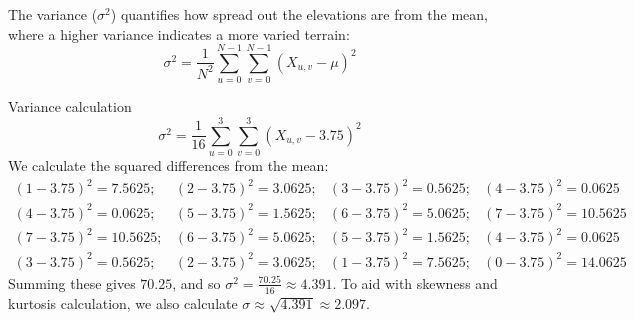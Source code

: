 The variance ($\sigma^2$) quantifies how spread out the elevations are from the mean, where a higher variance indicates a more varied terrain:
\[\sigma^2=\frac{1}{N^2}\sum_{u=0}^{N-1}\sum_{v=0}^{N-1}{(X_{u,v}-\mu)}^2\]
\begin{example}{Variance calculation}
    \[\sigma^2=\frac{1}{16}\sum_{u=0}^{3}\sum_{v=0}^{3}{(X_{u,v}-3.75)}^2\]
    We calculate the squared differences from the mean:
    \begin{equation*}
        \begin{matrix}
            (1-3.75)^2=7.5625; & (2-3.75)^2=3.0625; & (3-3.75)^2=0.5625; & (4-3.75)^2=0.0625 \\
            (4-3.75)^2=0.0625; & (5-3.75)^2=1.5625; & (6-3.75)^2=5.0625; & (7-3.75)^2=10.5625 \\
            (7-3.75)^2=10.5625; & (6-3.75)^2=5.0625; & (5-3.75)^2=1.5625; & (4-3.75)^2=0.0625 \\
            (3-3.75)^2=0.5625; & (2-3.75)^2=3.0625; & (1-3.75)^2=7.5625; & (0-3.75)^2= 14.0625
        \end{matrix}
    \end{equation*}
    Summing these gives $70.25$, and so $\sigma^2=\frac{70.25}{16}\approx4.391$. To aid with skewness and kurtosis calculation, we also calculate $\sigma\approx\sqrt{4.391}\approx2.097$.
\end{example}

